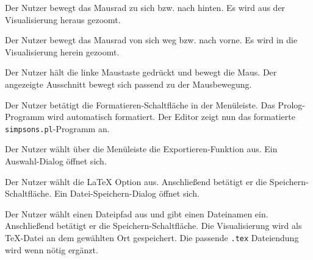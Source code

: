 \documentclass[parskip=full,11pt,twoside]{scrartcl}
\begin{document}

{Der Nutzer bewegt das Mausrad zu sich bzw. nach hinten.}
{Es wird aus der Visualisierung heraus gezoomt.}

{Der Nutzer bewegt das Mausrad von sich weg bzw. nach vorne.}
{Es wird in die Visualisierung herein gezoomt.}


{Der Nutzer hält die linke Maustaste gedrückt und bewegt die Maus.}
{Der angezeigte Ausschnitt bewegt sich passend zu der Mausbewegung.}


{Der Nutzer betätigt die Formatieren-Schaltfläche in der Menüleiste.}
{Das Prolog-Programm wird automatisch formatiert. Der Editor zeigt nun das formatierte \texttt{simpsons.pl}-Programm an.}


{Der Nutzer wählt über die Menüleiste die Exportieren-Funktion aus.}
{Ein Auswahl-Dialog öffnet sich.}

{Der Nutzer wählt die LaTeX Option aus. Anschließend betätigt er die Speichern-Schaltfläche.}
{Ein Datei-Speichern-Dialog öffnet sich.}

{Der Nutzer wählt einen Dateipfad aus und gibt einen Dateinamen ein. Anschließend betätigt er die Speichern-Schaltfläche.}
{Die Visualisierung wird als TeX-Datei an dem gewählten Ort gespeichert. Die passende \texttt{.tex} Dateiendung wird wenn nötig ergänzt.}

\end{document}
